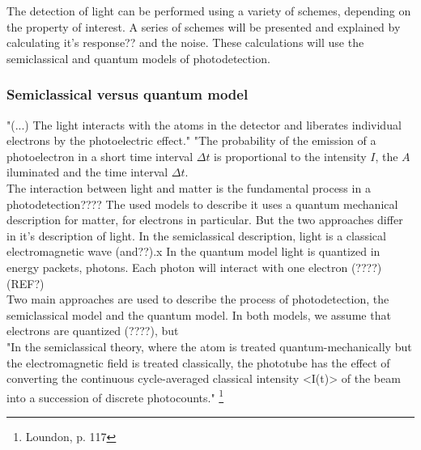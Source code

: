 \begin{bibunit}[plain]
The detection of light can be performed using a variety of schemes, depending on the property of interest. A series of schemes will be presented and explained by calculating it's response?? and the noise. These calculations will use the semiclassical and quantum models of photodetection.




\subsubsection{Semiclassical versus quantum model}



"(...) The light interacts with the atoms in the detector and liberates individual electrons by the photoelectric effect."
"The probability of the emission of a photoelectron in a short time interval $\Delta t$ is proportional to the intensity $I$, the $A$ iluminated and the time interval $\Delta t$.\\




The interaction between light and matter is the fundamental process in a photodetection???? The used models to describe it uses a quantum mechanical description for matter, for electrons in particular. But the two approaches differ in it's description of light. In the semiclassical description, light is a classical electromagnetic wave (and??).x
In the quantum model light is quantized in energy packets, photons. Each photon will interact with one electron (????)\\
(REF?)\\

Two main approaches are used to describe the process of photodetection, the semiclassical model and the quantum model. In both models, we assume that electrons are quantized (????), but 
\\

"In the semiclassical theory, where the atom is treated quantum-mechanically but the electromagnetic field is treated classically, the phototube has the effect of converting the continuous cycle-averaged classical intensity <I(t)> of the beam into a succession of discrete photocounts."
\footnote{Loundon, p. 117}\\



\end{bibunit}

